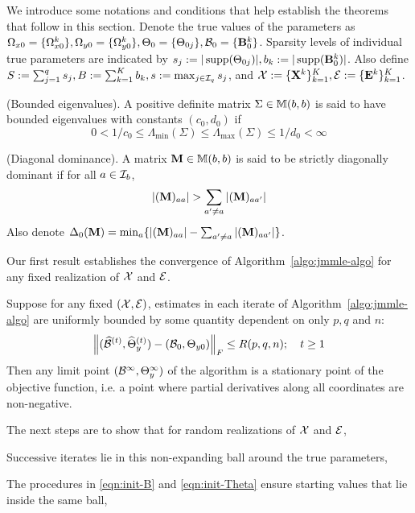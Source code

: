 We introduce some notations and conditions that help establish the theorems that follow in this section. Denote the true values of the parameters as $\Omega_{x 0} = \{ \Omega_{x 0}^k \}, \Omega_{y 0} = \{ \Omega_{y 0}^k \}, \Theta_0 = \{ \Theta_{0 j} \}, {\cal{B}}_0 = \{ {\mathbf{B}}_0^k \}$. Sparsity levels of individual true parameters are indicated by $s_j := | \operatorname*{supp} (\Theta_{0j})|, b_k := | \operatorname*{supp}({\mathbf{B}}^k_0) |$. Also define $S := \sum_{j=1}^q s_j, B:= \sum_{k=1}^K b_k, s:= \max_{j \in {\cal{I}}_q } s_j$, and ${\cal{X}} := \{ {\mathbf{X}}^k \}_{k=1}^K, {\cal{E}} := \{ {\mathbf{E}}^k \}_{k=1}^K$.

\vspace{1em}
 (Bounded eigenvalues). A positive definite matrix $\Sigma \in {\mathbb{M}}(b,b)$ is said to have bounded eigenvalues with constants $(c_0, d_0)$ if
%
\[
0 < 1/c_0 \leq \Lambda_{\min} (\Sigma) \leq \Lambda_{\max} (\Sigma) \leq 1/d_0 < \infty
\]

 (Diagonal dominance). A matrix ${\mathbf{M}}  \in {\mathbb{M}}(b,b)$ is said to be strictly diagonally dominant if for all $a \in {\cal{I}}_b$,
%
$$
| ({\mathbf{M}})_{aa} | > \sum_{a' \neq a} |({\mathbf{M}})_{aa'} |
$$
%
Also denote $\Delta_0 ({\mathbf{M}}) = \min_a \{ | ({\mathbf{M}})_{aa} | - \sum_{a' \neq a} |({\mathbf{M}})_{aa'} | \}$.

Our first result establishes the convergence of Algorithm~\ref{algo:jmmle-algo} for any fixed realization of ${\cal{X}}$ and ${\cal{E}}$.

\begin{Theorem}
\label{thm:algo-convergence}
Suppose for any fixed $({\cal{X}}, {\cal{E}})$, estimates in each iterate of Algorithm~\ref{algo:jmmle-algo} are uniformly bounded by some quantity dependent on only $p, q$ and $n$:
%
\begin{align}
\left\| (\widehat {{\cal{B}}}^{(t)}, \widehat \Theta_y^{(t)}) - ( {\cal{B}}_0, \Theta_{y 0}) \right\|_F
\leq R(p,q,n);
\quad t \geq 1
\end{align}
%
Then any limit point $({\cal{B}}^\infty, \Theta_y^\infty)$ of the algorithm is a stationary point of the objective function, i.e. a point where partial derivatives along all coordinates are non-negative.
\end{Theorem}

The next steps are to show that for random realizations of ${\cal{X}}$ and ${\cal{E}}$,
%

\vspace{1em}
 Successive iterates lie in this non-expanding ball around the true parameters,

 The procedures in \eqref{eqn:init-B} and \eqref{eqn:init-Theta} ensure starting values that lie inside the same ball,
%

